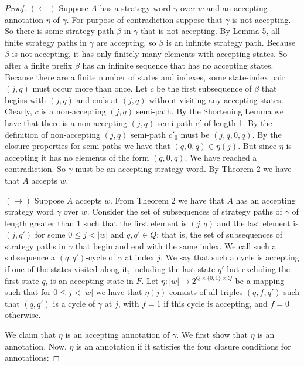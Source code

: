 \documentclass[10pt,a4paper]{amsart}
\theoremstyle{plain}
\theoremstyle{definition}
\theoremstyle{definition}
\DeclareMathOperator{\?}{?}
\begin{document}
\begin{proof}

$(\leftarrow)$ Suppose $A$ has a strategy word $\gamma$ over $w$ and an accepting annotation $\eta$ of $\gamma$. For purpose of contradiction suppose that $\gamma$ is not accepting. So there is some strategy path $\beta$ in $\gamma$ that is not accepting. By Lemma 5, all finite strategy paths in $\gamma$ are accepting, so $\beta$ is an infinite strategy path. Because $\beta$ is not accepting, it has only finitely many elements with accepting states. So after a finite prefix $\beta$ has an infinite sequence that has no accepting states. Because there are a finite number of states and indexes, some state-index pair $(j,q)$ must occur more than once. Let $c$ be the first subsequence of $\beta$ that begins with $(j,q)$ and ends at $(j,q)$ without visiting any accepting states. Clearly, $c$ is a non-accepting $(j,q)$ semi-path. By the Shortening Lemma we have that there is a non-accepting $(j,q)$ semi-path $c'$ of length 1. By the definition of non-accepting $(j,q)$ semi-path $c'_0$ must be $(j,q,0,q)$. By the closure properties for semi-paths we have that $(q,0,q) \in \eta(j)$. But since $\eta$ is accepting it has no elements of the form $(q,0,q)$. We have reached a contradiction. So $\gamma$ must be an accepting strategy word. By Theorem 2 we have that $A$ accepts $w$.

$(\rightarrow)$ Suppose $A$ accepts $w$. From Theorem 2 we have that $A$ has an accepting strategy word $\gamma$ over $w$. Consider the set of subsequences of strategy paths of $\gamma$ of length greater than 1 such that the first element is $(j,q)$ and the last element is $(j,q')$ for some $0 \leq j < |w|$ and $q,q' \in Q$; that is, the set of subsequences of strategy paths in $\gamma$ that begin and end with the same index. We call such a subsequence a $(q,q')$-cycle of $\gamma$ at index $j$. We say that such a cycle is accepting if one of the states visited along it, including the last state $q'$ but excluding the first state $q$, is an accepting state in $F$.
Let $\eta : |w| \rightarrow 2^{Q \times \{0,1\} \times Q}$ be a mapping such that for $0\leq j < |w|$ we have that $\eta(j)$ consists of all triples $(q,f,q')$ such that $(q,q')$ is a cycle of $\gamma$ at $j$, with $f=1$ if this cycle is accepting, and $f=0$ otherwise.

We claim that $\eta$ is an accepting annotation of $\gamma$. We first show that $\eta$ is an annotation. Now, $\eta$ is an annotation if it satisfies the four closure conditions for annotations:


\end{proof}
\end{document}
